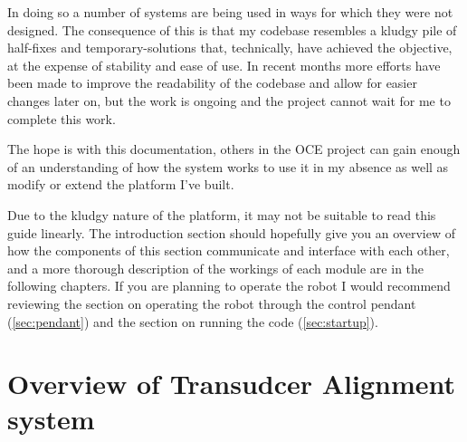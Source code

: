 \documentclass[11pt]{article}
\begin{document}
In doing so a number of systems are being used in ways for which they were not designed. The consequence of this is that my codebase resembles a kludgy pile of half-fixes and temporary-solutions that, technically, have achieved the objective, at the expense of stability and ease of use.
In recent months more efforts have been made to improve the readability of the codebase and allow for easier changes later on, but the work is ongoing and the project cannot wait for me to complete this work.

The hope is with this documentation, others in the OCE project can gain enough of an understanding of how the system works to use it in my absence as well as modify or extend the platform I've built.

Due to the kludgy nature of the platform, it may not be suitable to read this guide linearly. The introduction section should hopefully give you an overview of how the components of this section communicate and interface with each other, and a more thorough description of the workings of each module are in the following chapters.
If you are planning to operate the robot I would recommend reviewing the section on operating the robot through the control pendant (\autoref{sec:pendant}) and the section on running the code (\autoref{sec:startup}).

\section{Overview of Transudcer Alignment system}
\begin{center}
\end{center}
\end{document}
